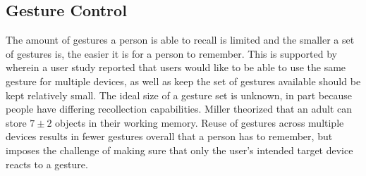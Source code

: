 \subsection{Gesture Control}
\label{sec:introduction:gesture-control}

The amount of gestures a person is able to recall is limited and the smaller a set of gestures is, the easier it is for a person to remember. This is supported by \cite{Kela2006} wherein a user study reported that users would like to be able to use the same gesture for multiple devices, as well as keep the set of gestures available should be kept relatively small.
The ideal size of a gesture set is unknown, in part because people have differing recollection capabilities. Miller \cite{miller1956magical} theorized that an adult can store $7 \pm 2$ objects in their working memory.
Reuse of gestures across multiple devices results in fewer gestures overall that a person has to remember, but imposes the challenge of making sure that only the user's intended target device reacts to a gesture.